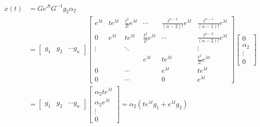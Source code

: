 \documentclass[twoside]{article}
\begin{document}
\begin{align*}
	x(t) &= G e^{J t} G^{-1} g_2 \alpha_2
	\\ &= \left[ \begin{array}{ccc} g_1 & g_2 & \cdots g_n \end{array} \right] 
\left[  \begin{array}{cccccc} e^{\lambda t} & t e^{\lambda t} & \frac{t^2}{2 !} e^{\lambda t} 
& \cdots & \frac{t^{n-2}}{(n-2) !} e^{\lambda t}  & \frac{t^{n-1}}{(n-1) !} e^{\lambda t}
\\ 0 & e^{\lambda t} & t e^{\lambda t} & \frac{t^2}{2 !} e^{\lambda t} & \cdots  & \frac{t^{n-2}}{(n-2) !} e^{\lambda t}
\\  \vdots &  & \ddots &  &  & \vdots \\ 
& & & e^{\lambda t} & t e^{\lambda t} & \frac{t^2}{2 !} e^{\lambda t}
\\ 0 &  & \cdots  &  & e^{\lambda t} & t e^{\lambda t} \\
0 &  & \cdots &  & 0 & e^{\lambda t} \end{array} \right] 
%
	\left[ \begin{array}{c} 0 \\ \alpha_2 \\ \vdots \\ 0 \end{array} \right] 
	\\ 
	&= \left[ \begin{array}{ccc} g_1 & g_2 & \cdots g_n \end{array} \right] \left[ \begin{array}{c} \alpha_2 t e^{\lambda t} \\ \alpha_2 e^{\lambda t} \\ \vdots \\ 0 \end{array} \right] = \alpha_2 \left( t e^{\lambda t} g_1  + e^{\lambda t} g_2 \right)
\end{align*}
%
\end{document}
